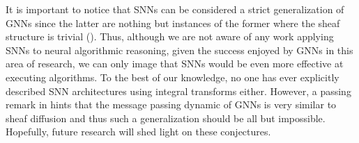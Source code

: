 \documentclass[11pt,a4paper,openright,twoside]{report}
\theoremstyle{plain}
\theoremstyle{definition}
\begin{document}
It is important to notice that SNNs can be considered a strict generalization of GNNs  since the latter are nothing but instances of the former where the sheaf structure is trivial (\cite{bodnar2022neural}). Thus, although we are not aware of any work applying SNNs to neural algorithmic reasoning, given the success enjoyed by GNNs in this area of research, we can only image that SNNs would be even more effective at executing algorithms. 
To the best of our knowledge, no one has ever explicitly described SNN architectures using integral transforms either. However, a passing remark in \cite{dudzik2024asynchronous} hints that the message passing dynamic of GNNs is very similar to sheaf diffusion and thus such a generalization should be all but impossible. Hopefully, future research will shed light on these conjectures.


\clearpage{\pagestyle{empty}\cleardoublepage}
\end{document}
